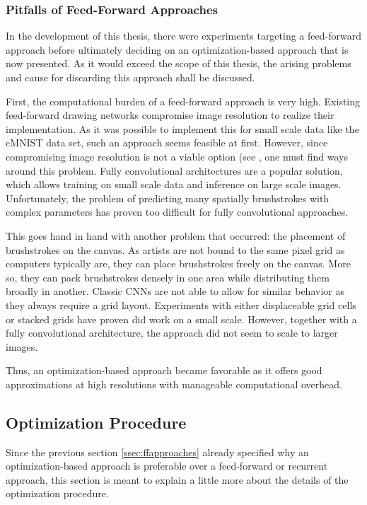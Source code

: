 \subsubsection{Pitfalls of Feed-Forward Approaches}

In the development of this thesis, there were experiments targeting a feed-forward approach before ultimately deciding on an optimization-based approach that is now presented.
As it would exceed the scope of this thesis, the arising problems and cause for discarding this approach shall be discussed.

First, the computational burden of a feed-forward approach is very high.
Existing feed-forward drawing networks compromise image resolution to realize their implementation.
As it was possible to implement this for small scale data like the cMNIST data set, such an approach seems feasible at first.  
However, since compromising image resolution is not a viable option (see , one must find ways around this problem.
Fully convolutional architectures are a popular solution, which allows training on small scale data and inference on large scale images.
Unfortunately, the problem of predicting many spatially brushstrokes with complex parameters has proven too difficult for fully convolutional approaches.

This goes hand in hand with another problem that occurred: the placement of brushstrokes on the canvas.
As artists are not bound to the same pixel grid as computers typically are, they can place brushstrokes freely on the canvas.
More so, they can pack brushstrokes densely in one area while distributing them broadly in another.
Classic CNNs are not able to allow for similar behavior as they always require a grid layout.
Experiments with either displaceable grid cells or stacked grids have proven did work on a small scale.
However, together with a fully convolutional architecture, the approach did not seem to scale to larger images.

Thus, an optimization-based approach became favorable as it offers good approximations at high resolutions with manageable computational overhead.

\subsection{Optimization Procedure}
Since the previous section \ref{ssec:ffapproaches} already specified why an optimization-based approach is preferable over a feed-forward or recurrent approach, this section is meant to explain a little more about the details of the optimization procedure.


